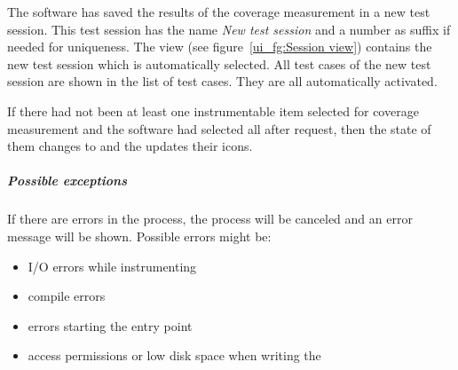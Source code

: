 \par
The software has saved the results of the coverage measurement in a new test session. This test session has the name \textit{New test session} and a number as suffix if needed for uniqueness. The  view (see figure~\ref{ui_fg:Session view}) contains the new test session which is automatically selected. All test cases of the new test session are shown in the list of test cases. They are all automatically activated.
\par
If there had not been at least one instrumentable item selected for coverage measurement and the software had selected all after request, then the state of them changes to  and the  updates their icons.
\subparagraph{Possible exceptions}
If there are errors in the process, the process will be canceled and an error message will be shown. Possible errors might be:
\begin{itemize}
  \item I/O errors while instrumenting
  \item compile errors
  \item errors starting the entry point
  \item access permissions or low disk space when writing the 
\end{itemize}

